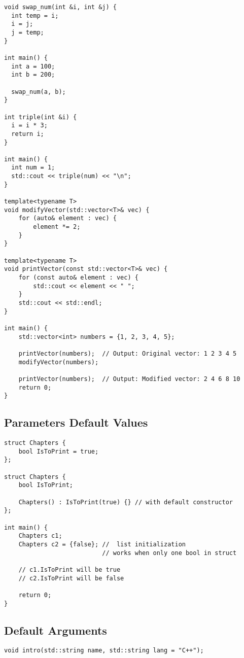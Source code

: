 \begin{verbatim}
void swap_num(int &i, int &j) {
  int temp = i;
  i = j;
  j = temp;
}
 
int main() {
  int a = 100;
  int b = 200;
 
  swap_num(a, b);
}

int triple(int &i) {
  i = i * 3;
  return i;
}

int main() {
  int num = 1;
  std::cout << triple(num) << "\n";
}

template<typename T>
void modifyVector(std::vector<T>& vec) {
    for (auto& element : vec) {
        element *= 2;
    }
}

template<typename T>
void printVector(const std::vector<T>& vec) {
    for (const auto& element : vec) {
        std::cout << element << " ";
    }
    std::cout << std::endl;
}

int main() {
    std::vector<int> numbers = {1, 2, 3, 4, 5};

    printVector(numbers);  // Output: Original vector: 1 2 3 4 5
    modifyVector(numbers);

    printVector(numbers);  // Output: Modified vector: 2 4 6 8 10
    return 0;
}
\end{verbatim}

\subsection{Parameters Default Values}

\begin{verbatim}
struct Chapters {
    bool IsToPrint = true;
};

struct Chapters {
    bool IsToPrint;

    Chapters() : IsToPrint(true) {} // with default constructor
};

int main() {
    Chapters c1;
    Chapters c2 = {false}; //  list initialization
                           // works when only one bool in struct

    // c1.IsToPrint will be true
    // c2.IsToPrint will be false

    return 0;
}
\end{verbatim}

\subsection{Default Arguments}

\begin{verbatim}
void intro(std::string name, std::string lang = "C++");
\end{verbatim}

